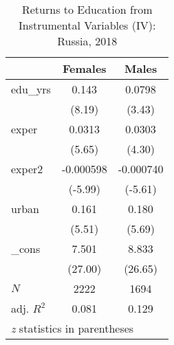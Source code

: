 \begin{table}[htbp]\centering
\caption{Returns to Education from Instrumental Variables (IV): Russia, 2018}
\begin{tabular}{l*{2}{c}}
\hline\hline
          &\multicolumn{1}{c}{Females}&\multicolumn{1}{c}{Males}\\
\hline
edu\_yrs   &    0.143&   0.0798\\
          &   (8.19)&   (3.43)\\
exper     &   0.0313&   0.0303\\
          &   (5.65)&   (4.30)\\
exper2    &-0.000598&-0.000740\\
          &  (-5.99)&  (-5.61)\\
urban     &    0.161&    0.180\\
          &   (5.51)&   (5.69)\\
\_cons    &    7.501&    8.833\\
          &  (27.00)&  (26.65)\\
\hline
\(N\)     &     2222&     1694\\
adj. \(R^{2}\)&    0.081&    0.129\\
\hline\hline
\multicolumn{3}{l}{\footnotesize \textit{z} statistics in parentheses}\\
\end{tabular}
\end{table}
